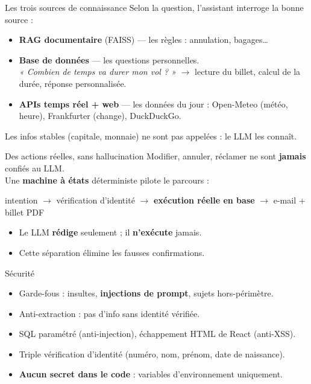 \documentclass[aspectratio=169,11pt]{beamer}
\newcommand{\hl}[1]{\textbf{\color{accent}#1}}
\begin{document}
\begin{frame}{Les trois sources de connaissance}
  Selon la question, l'assistant interroge la bonne source :
  \vspace{0.3cm}
  \begin{itemize}
    \item \hl{RAG documentaire} (FAISS) --- les règles : annulation, bagages\dots
    \item \hl{Base de données} --- les questions personnelles.\\
          \small\emph{« Combien de temps va durer mon vol ? »} $\rightarrow$ lecture du
          billet, calcul de la durée, réponse personnalisée.
    \item \hl{APIs temps réel + web} --- les données du jour : Open-Meteo (météo,
          heure), Frankfurter (change), DuckDuckGo.
  \end{itemize}
  \vfill
  \begin{center}\small\color{soft}
    Les infos stables (capitale, monnaie) ne sont pas appelées : le LLM les connaît.
  \end{center}
\end{frame}

\begin{frame}{Des actions réelles, sans hallucination}
  Modifier, annuler, réclamer ne sont \hl{jamais} confiés au LLM.\\[0.3cm]
  Une \hl{machine à états} déterministe pilote le parcours :
  \vspace{0.3cm}
  \begin{center}\small
    intention $\rightarrow$ vérification d'identité $\rightarrow$
    \textbf{exécution réelle en base} $\rightarrow$ e-mail + billet PDF
  \end{center}
  \vspace{0.3cm}
  \begin{itemize}
    \item Le LLM \hl{rédige} seulement ; il \hl{n'exécute} jamais.
    \item Cette séparation élimine les fausses confirmations.
  \end{itemize}
\end{frame}

\begin{frame}{Sécurité}
  \begin{itemize}
    \item Garde-fous : insultes, \hl{injections de prompt}, sujets hors-périmètre.
    \item Anti-extraction : pas d'info sans identité vérifiée.
    \item SQL paramétré (anti-injection), échappement HTML de React (anti-XSS).
    \item Triple vérification d'identité (numéro, nom, prénom, date de naissance).
    \item \hl{Aucun secret dans le code} : variables d'environnement uniquement.
  \end{itemize}
\end{frame}
\end{document}
